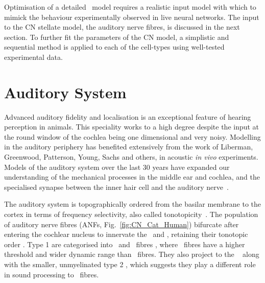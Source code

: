 
Optimisation of a detailed \BNN~model requires a realistic input model with which to mimick the behaviour experimentally observed in live neural networks. The input to the CN stellate model, the auditory nerve fibres, is discussed in the next section. To further fit the parameters of the CN model, a simplistic and sequential method is applied to each of the cell-types using well-tested experimental data.

\section{Auditory System    \label{sec:CN:auditory-model}}

Advanced auditory fidelity and localisation is an exceptional feature of hearing perception in animals.
This speciality works to a high degree despite the input at the round window of the cochlea being one dimensional and very noisy.
Modelling in the auditory periphery has benefited extensively from the work of Liberman, Greenwood, Patterson, Young, Sachs and others, in acoustic \textit{in vivo} experiments.
Models of the auditory system over the last 30 years have expanded our understanding of the mechanical processes in the middle ear and cochlea, and the specialised synapse between the inner hair cell and the auditory nerve~\citep{DavisVoigt:1991,Carney:1993,MeddisHewittEtAl:1990}.


The auditory system is topographically ordered from the basilar membrane to the cortex in terms of frequency selectivity, also called tonotopicity~\citep{YoungOertel:2004}.
The population of auditory nerve fibres (ANFs, Fig.~\ref{fig:CN_Cat_Human}) bifurcate after entering the cochlear nucleus to innervate the \VCN~and \DCN, retaining their tonotopic order \citep{Lorente:1981,Liberman:1982,Liberman:1993}.
Type 1 \ANFs are categorised into {\HSR}~and {\LSR}~fibres \citep{Liberman:1978}, where \LSR~fibres have a higher threshold and wider dynamic range than \HSR~fibres.
They also project to the \GCD~\citep{RyugoParks:2003, RyugoHaenggeliEtAl:2003} along with the smaller, unmyelinated type 2 \ANFs, which suggests they play a different role in sound processing to \HSR~fibres.

